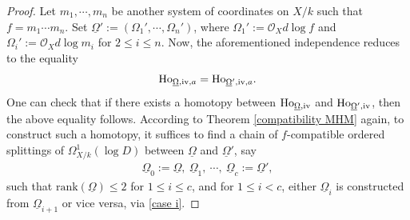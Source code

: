 \documentclass[12pt, a4paper]{article}
\begin{document}
\begin{proof}
Let $m_1,\cdots,m_n$ be another system of coordinates on $X/k$ such that $f=m_1\cdots m_n$. Set $\underline\Omega':=(\Omega_1',\cdots,\Omega_n')$, where $\Omega_1':=\mathcal O_Xd\log f$ and $\Omega_i':=\mathcal O_Xd\log m_i$ for $2\leq i\leq n$.  Now, the aforementioned independence reduces to the equality 
$$
\mathrm{Ho}_{\underline\Omega,\mathrm{\uppercase\expandafter{\romannumeral4}},a}=\mathrm{Ho}_{\underline\Omega',\mathrm{\uppercase\expandafter{\romannumeral4}},a}.
$$
One can check that if there exists a homotopy between \( \mathrm{Ho}_{\underline\Omega, \mathrm{\uppercase\expandafter{\romannumeral4}}} \) and \( \mathrm{Ho}_{\underline\Omega', \mathrm{\uppercase\expandafter{\romannumeral4}}} \), then the above equality follows. According to Theorem \ref{compatibility MHM} again, to construct such a homotopy, it suffices to find a chain of \( f \)-compatible ordered splittings of \( \Omega^1_{X/k}(\log D) \) between \( \underline\Omega \) and \( \underline\Omega' \), say
\begin{eqnarray}\label{chain ordered splitting}
\underline\Omega_0 := \underline\Omega, \ \underline\Omega_1, \ \cdots, \ \underline\Omega_c := \underline\Omega',
\end{eqnarray}
such that \( \mathrm{rank}(\underline\Omega) \leq 2 \) for \( 1 \leq i \leq c \), and for \( 1 \leq i < c \), either \( \underline\Omega_i \) is constructed from \( \underline\Omega_{i+1} \) or vice versa, via \eqref{case i}.


\end{proof}
\end{document}
